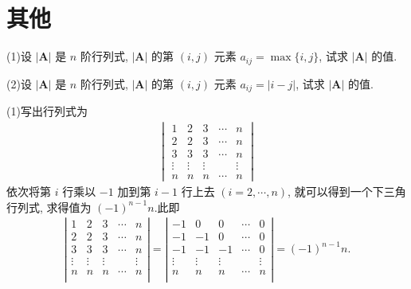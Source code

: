 \documentclass[../../main.tex]{subfiles}%
\begin{document}
\section{其他}

\begin{example}\label{example--经典行列式1}
(1)设 \(|\boldsymbol{A}|\) 是 \(n\) 阶行列式, \(|\boldsymbol{A}|\) 的第 \((i,j)\) 元素 \(a_{ij}=\max\{i,j\}\), 试求 \(|\boldsymbol{A}|\) 的值.
 
(2)设 \(|\boldsymbol{A}|\) 是 \(n\) 阶行列式, \(|\boldsymbol{A}|\) 的第 \((i,j)\) 元素 \(a_{ij}=|i - j|\), 试求 \(|\boldsymbol{A}|\) 的值.
\end{example}
\begin{solution}

(1)写出行列式为
\begin{align*}
\begin{vmatrix}
1 & 2 & 3 & \cdots & n \\
2 & 2 & 3 & \cdots & n \\
3 & 3 & 3 & \cdots & n \\
\vdots & \vdots & \vdots & & \vdots \\
n & n & n & \cdots & n
\end{vmatrix}
\end{align*}
依次将第 \(i\) 行乘以 \(-1\) 加到第 \(i - 1\) 行上去 \((i = 2,\cdots,n)\), 就可以得到一个下三角行列式, 求得值为 \((-1)^{n - 1}n\).此即
\begin{align*}
\left| \begin{matrix}
1&		2&		3&		\cdots&		n\\
2&		2&		3&		\cdots&		n\\
3&		3&		3&		\cdots&		n\\
\vdots&		\vdots&		\vdots&		&		\vdots\\
n&		n&		n&		\cdots&		n\\
\end{matrix} \right|=\left| \begin{matrix}
-1&		0&		0&		\cdots&		0\\
-1&		-1&		0&		\cdots&		0\\
-1&		-1&		-1&		\cdots&		0\\
\vdots&		\vdots&		\vdots&		&		\vdots\\
n&		n&		n&		\cdots&		n\\
\end{matrix} \right|=\left( -1 \right) ^{n-1}n.
\end{align*}


\end{solution}
\end{document}
